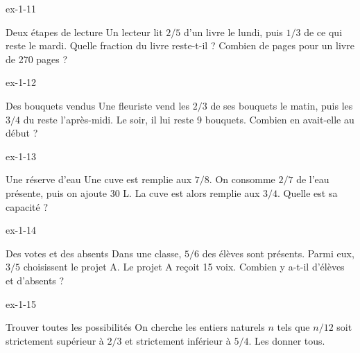 \clearpage{}
\begin{blocLivre}{ex-1-11}\begin{exercice}[3]{Deux étapes de lecture}
Un lecteur lit $2/5$ d’un livre le lundi, puis $1/3$ de ce qui reste le mardi. Quelle fraction du livre reste-t-il ? Combien de pages pour un livre de 270 pages ?
\end{exercice}\end{blocLivre}
\begin{blocLivre}{ex-1-12}\begin{exercice}[3]{Des bouquets vendus}
Une fleuriste vend les $2/3$ de ses bouquets le matin, puis les $3/4$ du reste l’après-midi. Le soir, il lui reste 9 bouquets. Combien en avait-elle au début ?
\end{exercice}\end{blocLivre}
\begin{blocLivre}{ex-1-13}\begin{exercice}[3]{Une réserve d’eau}
Une cuve est remplie aux $7/8$. On consomme $2/7$ de l’eau présente, puis on ajoute 30 L. La cuve est alors remplie aux $3/4$. Quelle est sa capacité ?
\end{exercice}\end{blocLivre}
\begin{blocLivre}{ex-1-14}\begin{exercice}[3]{Des votes et des absents}
Dans une classe, $5/6$ des élèves sont présents. Parmi eux, $3/5$ choisissent le projet A. Le projet A reçoit 15 voix. Combien y a-t-il d’élèves et d’absents ?
\end{exercice}\end{blocLivre}
\begin{blocLivre}{ex-1-15}\begin{exercice}[3]{Trouver toutes les possibilités}
On cherche les entiers naturels $n$ tels que $n/12$ soit strictement supérieur à $2/3$ et strictement inférieur à $5/4$. Les donner tous.
\end{exercice}\end{blocLivre}

\clearpage
